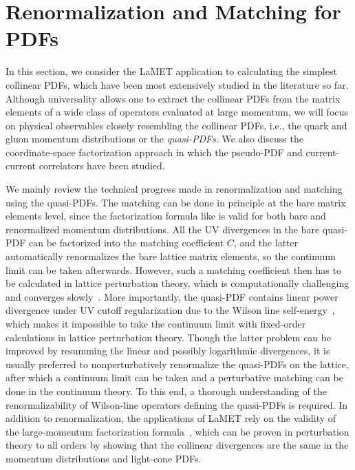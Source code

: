 \section{Renormalization and Matching for PDFs}
\label{sec:renorm}
In this section, we consider the LaMET application to calculating
the simplest collinear PDFs, which have been most extensively studied in the literature so far.
Although universality allows one to extract the collinear PDFs from the matrix elements of a wide class of operators evaluated at large momentum, we will focus on physical observables closely resembling the collinear PDFs, i.e.,
the quark and gluon momentum distributions or the {\it quasi-PDFs}. We also discuss
the coordinate-space factorization approach in which
the pseudo-PDF and current-current correlators have been studied.

We mainly review the technical progress made in renormalization and matching using the quasi-PDFs.
The matching can be done in principle at the bare matrix elements level,
since the factorization formula like  is valid for both bare and
renormalized momentum distributions. All the UV divergences in the bare quasi-PDF can be
factorized into the matching coefficient $C$, and the latter automatically
renormalizes the bare lattice matrix elements, so the continuum limit can be taken afterwards.
However,  such a matching coefficient then has to be calculated in lattice perturbation theory, which is computationally challenging and converges slowly~\cite{Lepage:1992xa}. More importantly, the quasi-PDF contains linear power divergence under UV cutoff regularization due to the Wilson line self-energy~\cite{Ji:2013dva,Xiong:2013bka}, which makes it impossible to take the continuum limit with fixed-order calculations in lattice perturbation theory. Though the latter problem can be improved by resumming the linear and possibly logarithmic divergences, it is usually preferred to nonperturbatively renormalize the quasi-PDFs on the lattice, after which a continuum limit can be taken and a perturbative matching can be done in the continuum theory. To this end, a thorough understanding of the renormalizability of Wilson-line operators defining the quasi-PDFs is required.
In addition to renormalization, the applications of LaMET rely on the validity of the large-momentum factorization formula~, which can be proven in perturbation theory to all orders by showing that the collinear divergences
are the same in the momentum distributions and light-cone PDFs.

